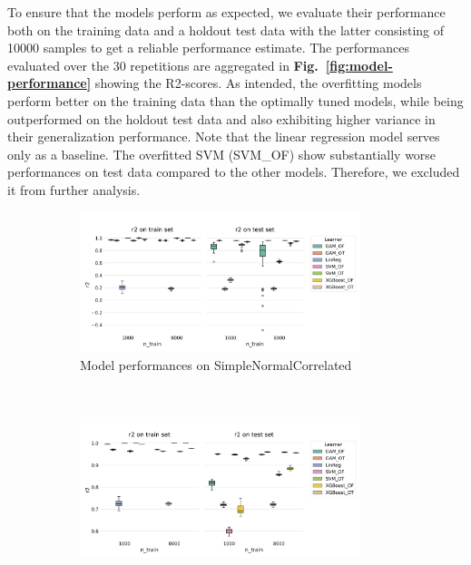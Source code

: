 \documentclass[runningheads]{llncs}
\begin{document}
To ensure that the models perform as expected, we evaluate their performance
both on the training data and a holdout test data with the latter consisting of
10000 samples to get a reliable performance estimate. The performances
evaluated over the 30 repetitions are aggregated in
\textbf{Fig.~\ref{fig:model-performance}} showing the R2-scores. As intended,
the overfitting models perform better on the training data than the optimally
tuned models, while being outperformed on the holdout test data and also
exhibiting higher variance in their generalization performance. Note that the
linear regression model serves only as a baseline. The overfitted SVM (SVM\_OF)
show substantially worse performances on test data compared to the other
models. Therefore, we excluded it from further analysis.

\begin{figure}[h!]
    \centering
    \begin{subfigure}[b]{\textwidth}
        \centering
        \includegraphics[width=0.9\textwidth]{img/model_performance_SimpleNormalCorrelated.png}
        \caption{Model performances on SimpleNormalCorrelated}
    \end{subfigure}
    \\[10pt]
    \vfill
    \begin{subfigure}[b]{\textwidth}
        \centering
        \includegraphics[width=0.9\textwidth]{img/model_performance_Friedman1.png}

\end{subfigure}
\end{figure}
\end{document}
